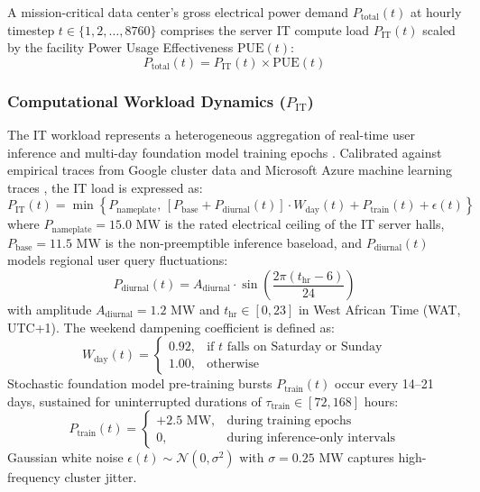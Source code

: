 \documentclass[12pt,3p,review]{elsarticle}
\begin{document}
A mission-critical data center's gross electrical power demand $P_{\text{total}}(t)$ at hourly timestep $t \in \{1, 2, \dots, 8760\}$ comprises the server IT compute load $P_{\text{IT}}(t)$ scaled by the facility Power Usage Effectiveness $\text{PUE}(t)$:
\begin{equation}
    P_{\text{total}}(t) = P_{\text{IT}}(t) \times \text{PUE}(t)
    \label{eq:ptotal}
\end{equation}

\subsubsection{Computational Workload Dynamics ($P_{\text{IT}}$)}
The IT workload represents a heterogeneous aggregation of real-time user inference and multi-day foundation model training epochs \cite{Weng2022, Patterson2021}. Calibrated against empirical traces from Google cluster data \cite{Reiss2012} and Microsoft Azure machine learning traces \cite{Cortez2017}, the IT load is expressed as:
\begin{equation}
    P_{\text{IT}}(t) = \min \left\{ P_{\text{nameplate}}, \, \left[ P_{\text{base}} + P_{\text{diurnal}}(t) \right] \cdot W_{\text{day}}(t) + P_{\text{train}}(t) + \epsilon(t) \right\}
    \label{eq:pit}
\end{equation}
where $P_{\text{nameplate}} = 15.0\text{ MW}$ is the rated electrical ceiling of the IT server halls, $P_{\text{base}} = 11.5\text{ MW}$ is the non-preemptible inference baseload, and $P_{\text{diurnal}}(t)$ models regional user query fluctuations:
\begin{equation}
    P_{\text{diurnal}}(t) = A_{\text{diurnal}} \cdot \sin\left(\frac{2\pi (t_{\text{hr}} - 6)}{24}\right)
\end{equation}
with amplitude $A_{\text{diurnal}} = 1.2\text{ MW}$ and $t_{\text{hr}} \in [0, 23]$ in West African Time (WAT, UTC+1). The weekend dampening coefficient is defined as:
\begin{equation}
    W_{\text{day}}(t) = \begin{cases} 
        0.92, & \text{if } t \text{ falls on Saturday or Sunday} \\
        1.00, & \text{otherwise}
    \end{cases}
\end{equation}
Stochastic foundation model pre-training bursts $P_{\text{train}}(t)$ occur every 14--21 days, sustained for uninterrupted durations of $\tau_{\text{train}} \in [72, 168]$ hours:
\begin{equation}
    P_{\text{train}}(t) = \begin{cases} 
        +2.5\text{ MW}, & \text{during training epochs} \\
        0, & \text{during inference-only intervals}
    \end{cases}
\end{equation}
Gaussian white noise $\epsilon(t) \sim \mathcal{N}(0, \sigma^2)$ with $\sigma = 0.25\text{ MW}$ captures high-frequency cluster jitter.
\end{document}
